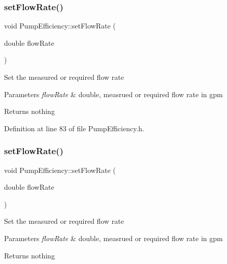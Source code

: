 \subsubsection{\texorpdfstring{set\+Flow\+Rate()}{setFlowRate()}\hspace{0.1cm}{\footnotesize\ttfamily [1/3]}}
{\footnotesize\ttfamily void Pump\+Efficiency\+::set\+Flow\+Rate (\begin{DoxyParamCaption}\item[{double}]{flow\+Rate }\end{DoxyParamCaption})\hspace{0.3cm}{\ttfamily [inline]}}

Set the measured or required flow rate


\begin{DoxyParams}{Parameters}
{\em flow\+Rate} & double, measrued or required flow rate in gpm\\
\hline
\end{DoxyParams}
\begin{DoxyReturn}{Returns}
nothing 
\end{DoxyReturn}


Definition at line 83 of file Pump\+Efficiency.\+h.

\mbox{\label{class_pump_efficiency_aad051c44f6bdbc6108f2c40450c9d510}} 
\subsubsection{\texorpdfstring{set\+Flow\+Rate()}{setFlowRate()}\hspace{0.1cm}{\footnotesize\ttfamily [2/3]}}
{\footnotesize\ttfamily void Pump\+Efficiency\+::set\+Flow\+Rate (\begin{DoxyParamCaption}\item[{double}]{flow\+Rate }\end{DoxyParamCaption})\hspace{0.3cm}{\ttfamily [inline]}}

Set the measured or required flow rate


\begin{DoxyParams}{Parameters}
{\em flow\+Rate} & double, measrued or required flow rate in gpm\\
\hline
\end{DoxyParams}
\begin{DoxyReturn}{Returns}
nothing 
\end{DoxyReturn}


